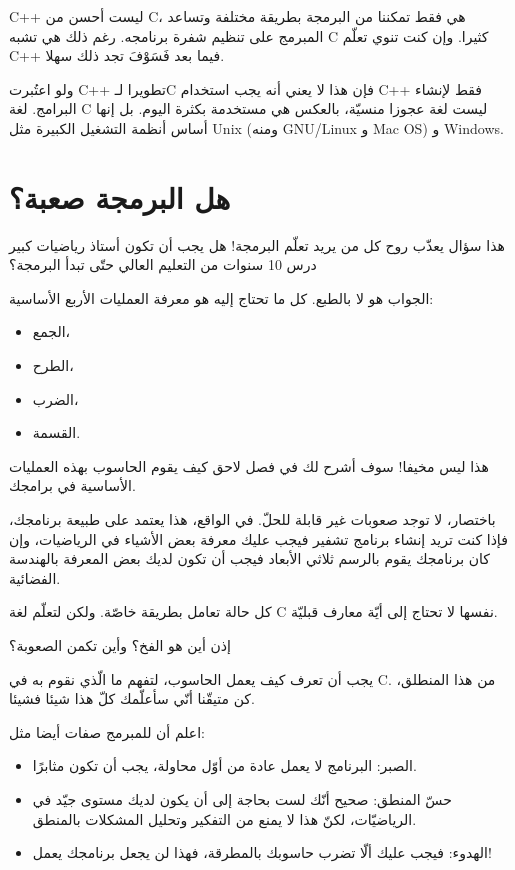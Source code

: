 \begin{information}
\textenglish{C++}
ليست أحسن من \textenglish{C}،
هي فقط تمكننا من البرمجة بطريقة مختلفة وتساعد المبرمج على تنظيم شفرة برنامجه. رغم ذلك هي تشبه \textenglish{C}
كثيرا. وإن كنت تنوي تعلّم \textenglish{C++}
فيما بعد فَسَوْفَ تجد ذلك سهلا.
\end{information}

ولو اعتُبرت
\textenglish{C++}
 تطويرا لـ\textenglish{C}
 فإن هذا لا يعني أنه يجب استخدام
\textenglish{C++}
 فقط لإنشاء البرامج. لغة
\textenglish{C}
 ليست لغة عجوزا منسيّة، بالعكس هي مستخدمة بكثرة اليوم. بل إنها أساس أنظمة التشغيل الكبيرة مثل
\textenglish{Unix }
(ومنه
\textenglish{GNU/Linux}
 و
\textenglish{Mac OS}) و
\textenglish{Windows}.

\section{هل البرمجة صعبة؟}
هذا سؤال يعذّب روح كل من يريد تعلّم البرمجة! هل يجب أن تكون أستاذ رياضيات كبير درس 10 سنوات من التعليم العالي حتّى تبدأ البرمجة؟

الجواب هو لا بالطبع. كل ما تحتاج إليه هو معرفة العمليات الأربع الأساسية:
\begin{itemize}
  \item الجمع،
  \item الطرح،
  \item الضرب،
  \item القسمة.
\end{itemize}
هذا ليس مخيفا! سوف أشرح لك في فصل لاحق كيف يقوم الحاسوب بهذه العمليات الأساسية في برامجك.

باختصار، لا توجد صعوبات غير قابلة للحلّ. في الواقع، هذا يعتمد على طبيعة برنامجك، فإذا كنت تريد إنشاء برنامج تشفير فيجب عليك معرفة بعض الأشياء في الرياضيات، وإن كان برنامجك يقوم بالرسم ثلاثي الأبعاد فيجب أن تكون لديك بعض المعرفة بالهندسة الفضائية.

كل حالة تعامل بطريقة خاصّة. ولكن لتعلّم لغة
\textenglish{C}
 نفسها لا تحتاج إلى أيّة معارف قبليّة.

\begin{question}
  إذن أين هو الفخ؟ وأين تكمن الصعوبة؟
\end{question}

يجب أن تعرف كيف يعمل الحاسوب، لتفهم ما الّذي نقوم به في \textenglish{C}. من هذا المنطلق، كن متيقّنا أنّي سأعلّمك كلّ هذا شيئا فشيئا.

اعلم أن للمبرمج صفات أيضا مثل:
\begin{itemize}
  \item الصبر: البرنامج لا يعمل عادة من أوّل محاولة، يجب أن تكون مثابرًا.
  \item حسّ المنطق: صحيح أنّك لست بحاجة إلى أن يكون لديك مستوى جيّد في الرياضيّات، لكنّ هذا لا يمنع من التفكير وتحليل المشكلات بالمنطق.
  \item الهدوء: فيجب عليك ألّا تضرب حاسوبك بالمطرقة، فهذا لن يجعل برنامجك يعمل!
\end{itemize}
